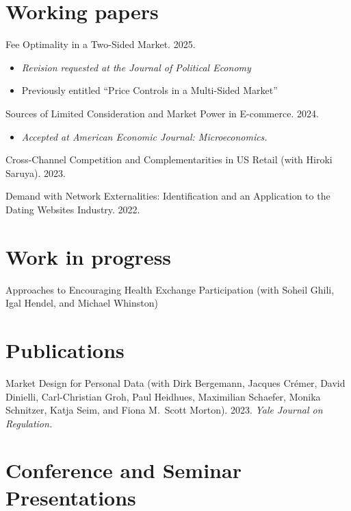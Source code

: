 \documentclass[11pt]{article} %
\begin{document}
\section*{Working papers}

Fee Optimality in a Two-Sided Market. 2025.
\begin{itemize}
	\item \textit{Revision requested at the Journal of Political Economy}
	\item Previously entitled ``Price Controls in a Multi-Sided Market''
\end{itemize}

\medskip

Sources of Limited Consideration and Market Power in E-commerce. 2024.
\begin{itemize}
	\item \textit{Accepted at American Economic Journal: Microeconomics.}
\end{itemize}

\medskip

Cross-Channel Competition and Complementarities in US Retail
(with Hiroki Saruya). 2023.

\medskip

 
Demand with Network Externalities: 
Identification and an Application to the Dating Websites Industry. 2022.

\section*{Work in progress}

Approaches to Encouraging Health Exchange Participation 
(with Soheil Ghili, Igal Hendel, and Michael Whinston)


\section*{Publications}

Market Design for Personal Data
(with Dirk Bergemann, Jacques Cr\'{e}mer, David Dinielli, 
Carl-Christian Groh, Paul Heidhues, Maximilian Schaefer, 
Monika Schnitzer, Katja Seim, and Fiona M.\ Scott Morton).
2023. \textit{Yale Journal on Regulation.}




\section*{Conference and Seminar Presentations}
\end{document}
